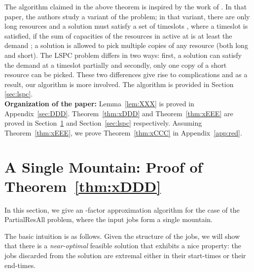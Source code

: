 \documentclass[11pt]{article}
\newcommand{\PResAll}{{\sc PartialResAll}}
\newcommand{\lspc}{{\sc LSPC}}
\begin{document}
The algorithm claimed in the above theorem is inspired by the work of \cite{esa2011}. In that paper, the authors
study a variant of the problem; in that variant,
there are only long resources and a solution  must satisfy a set of 
timeslots , where a timeslot 
is satisfied, if the sum of capacities of the resources in  active at 
is at least the demand ; a solution is allowed to pick multiple copies of any resource (both long and short). 
The {\lspc} problem differs in two ways: first, a solution can satisfy the demand at a timeslot partially
and secondly, only one copy of a short resource can be picked.
These two differences give rise to complications and as a result, our algorithm is more involved.
The algorithm is provided in Section \ref{sec:lspc}.\\

\noindent
{\bf Organization of the paper:}
Lemma~\ref{lem:XXX} is proved in Appendix~\ref{sec:DDD}.
Theorem~\ref{thm:xDDD} and Theorem~\ref{thm:xEEE} are
proved in Section~\ref{sec:mountain} and Section~\ref{sec:lspc} respectively.
Assuming Theorem~\ref{thm:xEEE}, we prove Theorem~\ref{thm:xCCC} 
in Appendix~\ref{app:red}. 

\section{A Single Mountain: Proof of Theorem~\ref{thm:xDDD}}
\label{sec:mountain}
In this section, we give an -factor approximation algorithm for the case of the {\PResAll} problem,
where the input jobs form a single mountain. 

The basic intuition is as follows. Given the structure of the jobs, we will show that there is a
{\em near-optimal} feasible solution that exhibits a nice property: 
the jobs discarded from the solution are extremal either in their
start-times or their end-times. 
\end{document}

